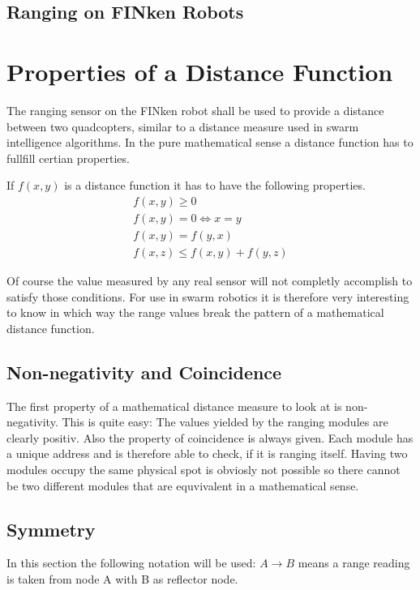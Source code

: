 \subsection{Ranging on FINken Robots}

\section{Properties of a Distance Function}
The ranging sensor on the FINken robot shall be used to provide a distance between two quadcopters, similar to a distance measure used in swarm intelligence algorithms.
In the pure mathematical sense a distance function has to fullfill certian properties.

If $f(x, y)$ is a distance function it has to have the following properties.
\begin{eqnarray}
f(x, y) \ge 0 \\
f(x, y) = 0 \iff x = y \\ 
f(x, y) = f(y, x) \\ 
f(x, z) \le f(x, y) + f(y, z)
\end{eqnarray}

Of course the value measured by any real sensor will not completly accomplish to satisfy those conditions.
For use in swarm robotics it is therefore very interesting to know in which way the range values break the pattern of a mathematical distance function.

\subsection{Non-negativity and Coincidence}

The first property of a mathematical distance measure to look at is non-negativity. This is quite easy: The values yielded by the ranging modules are clearly positiv.
Also the property of coincidence is always given.
Each module has a unique address and is therefore able to check, if it is ranging itself.
Having two modules occupy the same physical spot is obviosly not possible so there cannot be two different modules that are equvivalent in a mathematical sense.

\subsection{Symmetry}

In this section the following notation will be used: $A \rightarrow B$ means a range reading is taken from node A with B as reflector node.

